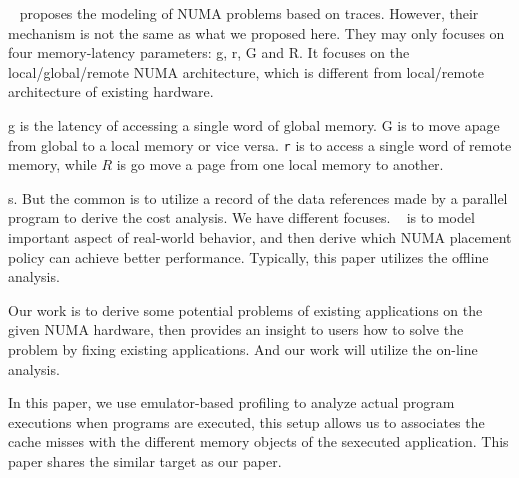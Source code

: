 ~\cite{Bolosky:1991:NPR:106972.106994} proposes the modeling of NUMA problems based on traces. 
However, their mechanism is not the same as what we proposed here. They may only focuses on four memory-latency parameters: g, r, G and R. It focuses on the local/global/remote NUMA architecture, which is different from local/remote architecture of existing hardware. 

g is the latency of accessing a single word of  global memory. G is to move apage from global to a local memory or vice versa. \texttt{r} is to access a single word of remote memory, while  $R$ is go move a page from one local memory to another. 

s. 
But the common is to utilize a record of the data references made by a parallel program to derive the cost analysis. 
We have different focuses. ~\cite{Bolosky:1991:NPR:106972.106994} is to model important aspect of real-world behavior, and then derive which NUMA placement policy can achieve better performance. Typically, this paper utilizes the offline analysis.   

Our work is to derive some potential problems of existing applications on the given NUMA hardware, then provides an insight to users how to solve the problem by fixing existing applications. And our work will utilize the on-line analysis. 

In this paper, we use emulator-based profiling to analyze actual program executions when programs are executed, this setup allows us to associates the cache misses with the different memory objects of the sexecuted application. 
This paper shares the similar target as our paper. 



